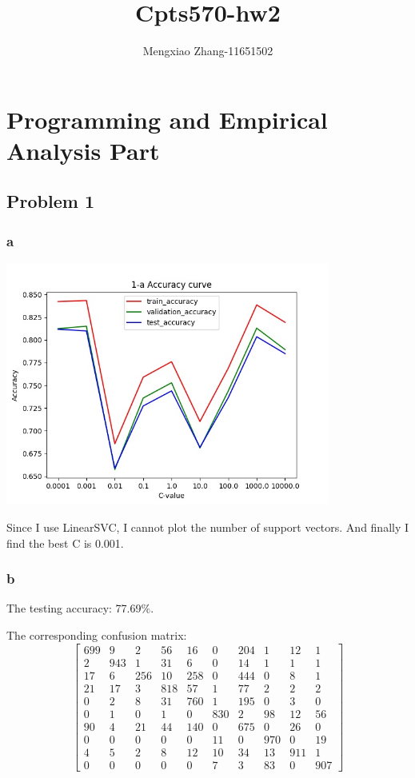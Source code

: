 \documentclass[12pt]{article}
\author{Mengxiao Zhang-11651502}
\title{Cpts570-hw2}
\begin{document}
    \maketitle
    \pagebreak
    \section{Programming and Empirical Analysis Part}
        \subsection{Problem 1}
            \subsubsection{a}
                \includegraphics[height=8cm]{part1_a}
                \par Since I use LinearSVC, I cannot plot the
                number of support vectors. And finally I find the best C is 0.001.
            \subsubsection{b}
                \par The testing accuracy: 77.69\%.
                \par The corresponding confusion matrix:
                \[
                \left[
                \begin{array}{cccccccccc}
                699 &  9  &  2  & 56 &  16 & 0 & 204 & 1 & 12 & 1  \\
                2   & 943 &  1  & 31 &  6  & 0 & 14  & 1 & 1  & 1  \\
                17  &  6  & 256 & 10 & 258 & 0 & 444 & 0 & 8  & 1  \\
                21  &17   &3    &818 &57   &1  &77   &2  &2   &2\\
                0   & 2   &8    &31  &760  &1  &195  &0  &3   &0\\
                0   &1    &0    &1   &0    &830&2    &98 &12  &56\\
                90  &4    &21   &44  &140  &0  &675  &0  &26  &0\\
                0&0&0&0&0&11&0&970&0&19\\
                4&5&2&8&12&10&34&13&911&1\\
                0&0&0&0&0&7&3&83&0&907
                \end{array}
                \right]
                \]
\end{document}
